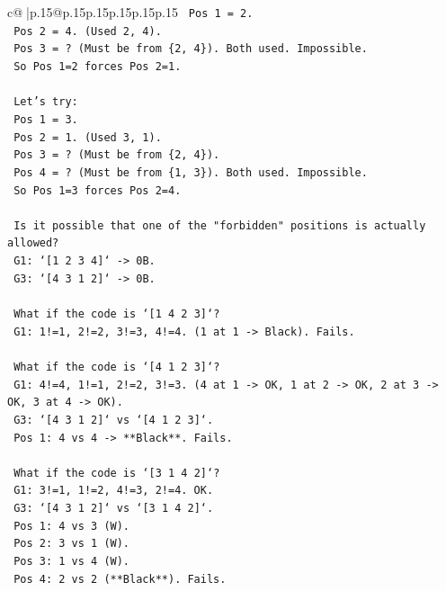 \documentclass{article}
\begin{document}
{\begin{supertabular}{c@{$\;$}|p{.15\linewidth}@{}p{.15\linewidth}p{.15\linewidth}p{.15\linewidth}p{.15\linewidth}p{.15\linewidth}}
{{{\texttt{    Pos 1 = 2.} \\
\texttt{    Pos 2 = 4. (Used 2, 4).} \\
\texttt{    Pos 3 = ? (Must be from \{2, 4\}). Both used. Impossible.} \\
\texttt{    So Pos 1=2 forces Pos 2=1.} \\
\\ 
\texttt{    Let's try:} \\
\texttt{    Pos 1 = 3.} \\
\texttt{    Pos 2 = 1. (Used 3, 1).} \\
\texttt{    Pos 3 = ? (Must be from \{2, 4\}).} \\
\texttt{    Pos 4 = ? (Must be from \{1, 3\}). Both used. Impossible.} \\
\texttt{    So Pos 1=3 forces Pos 2=4.} \\
\\ 
\texttt{    Is it possible that one of the "forbidden" positions is actually allowed?} \\
\texttt{    G1: `{[}1 2 3 4{]}` {-}> 0B.} \\
\texttt{    G3: `{[}4 3 1 2{]}` {-}> 0B.} \\
\\ 
\texttt{    What if the code is `{[}1 4 2 3{]}`?} \\
\texttt{    G1: 1!=1, 2!=2, 3!=3, 4!=4. (1 at 1 {-}> Black). Fails.} \\
\\ 
\texttt{    What if the code is `{[}4 1 2 3{]}`?} \\
\texttt{    G1: 4!=4, 1!=1, 2!=2, 3!=3. (4 at 1 {-}> OK, 1 at 2 {-}> OK, 2 at 3 {-}> OK, 3 at 4 {-}> OK).} \\
\texttt{    G3: `{[}4 3 1 2{]}` vs `{[}4 1 2 3{]}`.} \\
\texttt{    Pos 1: 4 vs 4 {-}> **Black**. Fails.} \\
\\ 
\texttt{    What if the code is `{[}3 1 4 2{]}`?} \\
\texttt{    G1: 3!=1, 1!=2, 4!=3, 2!=4. OK.} \\
\texttt{    G3: `{[}4 3 1 2{]}` vs `{[}3 1 4 2{]}`.} \\
\texttt{    Pos 1: 4 vs 3 (W).} \\
\texttt{    Pos 2: 3 vs 1 (W).} \\
\texttt{    Pos 3: 1 vs 4 (W).} \\
\texttt{    Pos 4: 2 vs 2 (**Black**). Fails.} \\
\\ 
}}}
\end{supertabular}}
\end{document}
